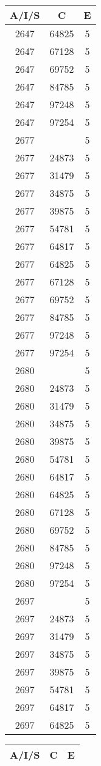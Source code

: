 {{\begin{tabular}{|c|c||c|}
        \hline
        \bf A/I/S & \bf C & \bf E \\
        \hline
2647&64825&5\\ 2647&67128&5\\ 2647&69752&5\\ 2647&84785&5\\ 2647&97248&5\\ 2647&97254&5\\ 2677& &5\\ 2677&24873&5\\ 2677&31479&5\\ 2677&34875&5\\ 2677&39875&5\\ 2677&54781&5\\ 2677&64817&5\\ 2677&64825&5\\ 2677&67128&5\\ 2677&69752&5\\ 2677&84785&5\\ 2677&97248&5\\ 2677&97254&5\\ 2680& &5\\ 2680&24873&5\\ 2680&31479&5\\ 2680&34875&5\\ 2680&39875&5\\ 2680&54781&5\\ 2680&64817&5\\ 2680&64825&5\\ 2680&67128&5\\ 2680&69752&5\\ 2680&84785&5\\ 2680&97248&5\\ 2680&97254&5\\ 2697& &5\\ 2697&24873&5\\ 2697&31479&5\\ 2697&34875&5\\ 2697&39875&5\\ 2697&54781&5\\ 2697&64817&5\\ 2697&64825&5\\ 
        \hline
        \end{tabular}
        \quad
        \begin{tabular}{|c|c||c|}
        \hline
        \bf A/I/S & \bf C & \bf E \\
        \hline

\end{tabular}}}
